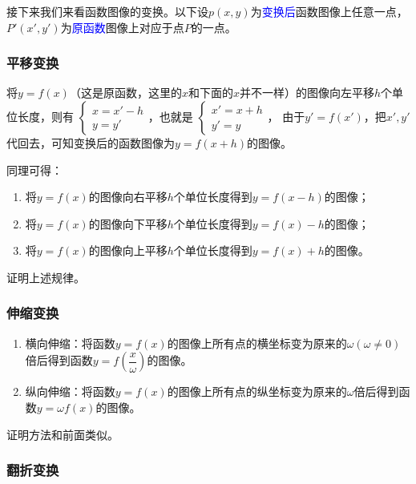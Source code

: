 \documentclass[lang=cn,math=cm,chinesefont=nofont,11pt,scheme=chinese,onecol]{elegantbook}
\begin{document}
接下来我们来看函数图像的变换。以下设$p(x,y)$为\textcolor{blue}{变换后}函数图像上任意一点，$P'(x',y')$为\textcolor{blue}{原函数}图像上对应于点$P$的一点。

\subsubsection{平移变换}

将$y=f(x)$（这是原函数，这里的$x$和下面的$x$并不一样）的图像向左平移$h$个单位长度，则有
$\begin{cases}
  x=x'-h
  \\y=y'
\end{cases}$，也就是
$\begin{cases}
  x'=x+h
  \\y'=y
\end{cases}$，
由于$y'=f(x')$，把$x',y'$代回去，可知变换后的函数图像为$y=f(x+h)$的图像。

同理可得：

\begin{enumerate}
  \item 将$y=f(x)$的图像向右平移$h$个单位长度得到$y=f(x-h)$的图像；
  \item 将$y=f(x)$的图像向下平移$h$个单位长度得到$y=f(x)-h$的图像；
  \item 将$y=f(x)$的图像向上平移$h$个单位长度得到$y=f(x)+h$的图像。
\end{enumerate}

\begin{exercise}
  证明上述规律。
\end{exercise}

\subsubsection{伸缩变换}

\begin{enumerate}
  \item 横向伸缩：将函数$y=f(x)$的图像上所有点的横坐标变为原来的$\omega(\omega\neq 0)$倍后得到函数$y=f(\dfrac{x}{\omega})$的图像。
  \item 纵向伸缩：将函数$y=f(x)$的图像上所有点的纵坐标变为原来的$\omega$倍后得到函数$y=\omega f(x)$的图像。
\end{enumerate}

证明方法和前面类似。

\subsubsection{翻折变换}
\end{document}
